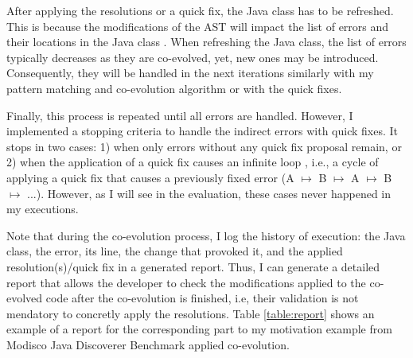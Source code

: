 After applying the resolutions or a quick fix, the Java class has to be refreshed. This is because the modifications of the AST will impact the list of errors and their locations in the Java class {\small{}}. When 
refreshing the Java class, the list of errors typically decreases as they are co-evolved,  
yet, new ones may be introduced. Consequently, they will be handled in the next iterations similarly with my pattern matching and co-evolution algorithm or with the quick fixes.

Finally, this process is repeated until all errors are handled. 
However, I implemented a stopping criteria to handle the indirect errors with quick fixes. 
It stops in two cases: 1) when only errors without any quick fix proposal remain, or 2) when the application of a quick fix causes an infinite loop \cite{cuadrado2018quick,khelladi2019detecting}, i.e., a cycle of applying a quick fix that causes a previously fixed error (A $\mapsto$ B $\mapsto$ A $\mapsto$ B $\mapsto$ ...). However, as I will see in the evaluation, these cases never happened in my executions. 


Note that during the co-evolution process, I log the history of execution: the Java class, the error, its line, the change that provoked it, and the applied resolution(s)/quick fix in a generated report. Thus, I can generate a detailed report that allows the developer to check the modifications applied to the co-evolved code after the co-evolution is finished, i.e, their validation is not mendatory to concretly apply the resolutions.
Table \ref{table:report} shows an example of a report for the corresponding part to my motivation example from Modisco Java Discoverer Benchmark applied co-evolution. %






